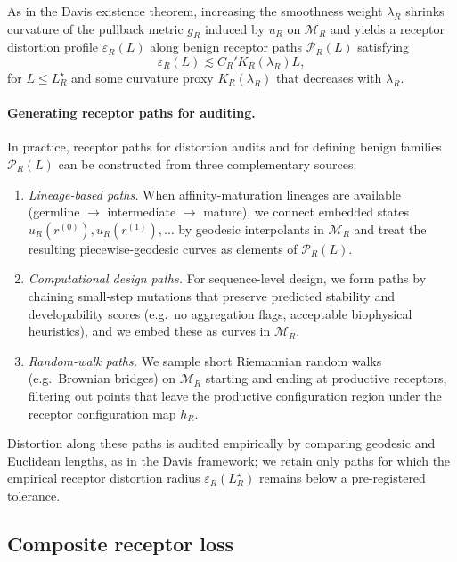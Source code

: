 \documentclass[11pt]{article}
\newcommand{\M}{\mathcal{M}}
\newcommand{\Pcal}{\mathcal{P}}
\begin{document}
As in the Davis existence theorem, increasing the smoothness weight
$\lambda_R$ shrinks curvature of the pullback metric $g_R$ induced by $u_R$
on $\M_R$ and yields a receptor distortion profile
$\varepsilon_R(L)$ along benign receptor paths
$\Pcal_R(L)$ satisfying
\[
  \varepsilon_R(L) \lesssim C_R' K_R(\lambda_R) L,
\]
for $L \le L_R^\star$ and some curvature proxy $K_R(\lambda_R)$ that decreases
with $\lambda_R$.

\paragraph{Generating receptor paths for auditing.}
In practice, receptor paths for distortion audits and for defining benign
families $\Pcal_R(L)$ can be constructed from three complementary sources:

\begin{enumerate}
  \item \emph{Lineage-based paths.} When affinity-maturation lineages are
    available (germline $\to$ intermediate $\to$ mature), we connect embedded
    states $u_R(r^{(0)}), u_R(r^{(1)}),\dots$ by geodesic interpolants in
    $\M_R$ and treat the resulting piecewise-geodesic curves as elements of
    $\Pcal_R(L)$.
  \item \emph{Computational design paths.} For sequence-level design, we form
    paths by chaining small-step mutations that preserve predicted stability
    and developability scores (e.g.\ no aggregation flags, acceptable
    biophysical heuristics), and we embed these as curves in $\M_R$.
  \item \emph{Random-walk paths.} We sample short Riemannian random walks
    (e.g.\ Brownian bridges) on $\M_R$ starting and ending at productive
    receptors, filtering out points that leave the productive configuration
    region under the receptor configuration map $h_R$.
\end{enumerate}

Distortion along these paths is audited empirically by comparing geodesic and
Euclidean lengths, as in the Davis framework; we retain only paths for which
the empirical receptor distortion radius $\varepsilon_R(L_R^\star)$ remains
below a pre-registered tolerance.

\subsection{Composite receptor loss}
\label{subsec:receptor-loss}
\end{document}
